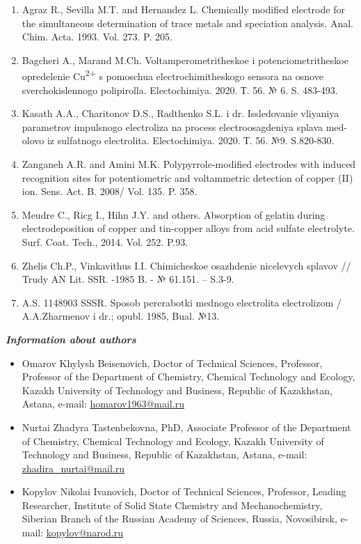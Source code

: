 \begin{enumerate}
\item
Agraz R., Sevilla M.T. and Hernandez L. Chemically modified
electrode for the simultaneous determination of trace metals and
speciation analysis. Anal. Chim. Acta. 1993. Vol. 273. P. 205.

\item
Bagcheri A., Marand M.Ch. Voltamperometritheskoe i
potenciometritheskoe opredelenie Cu\textsuperscript{2+} s pomoschua
electrochimitheskogo sensora na osnove sverchokislennogo polipirolla.
Electochimiya. 2020. Т. 56. № 6. S. 483-493.

\item
Kasath A.A., Charitonov D.S., Radthenko S.L. i dr. Issledovanie
vliyaniya parametrov impulsnogo electroliza na process electroosagdeniya
splava med-olovo iz sulfatnogo electrolita. Electochimiya. 2020. Т. 56.
№9. S.820-830.

\item
Zanganeh A.R. and Amini M.K. Polypyrrole-modified electrodes with
induced recognition sites for potentiometric and voltammetric detection
of copper (II) ion. Sens. Act. B. 2008/ Vol. 135. P. 358.

\item
Meudre C., Ricg I., Hihn J.Y. and others. Absorption of gelatin
during electrodeposition of copper and tin-copper alloys from acid
sulfate electrolyte. Surf. Coat. Tech., 2014. Vol. 252. P.93.

\item
Zhelis Ch.P., Vinkavithus I.I. Chimicheskoe osazhdenie nicelevych
splavov // Trudy AN Lit. SSR. -1985 B. - № 61.151. -- S.3-9.

\item
A.S. 1148903 SSSR. Sposob pererabotki mednogo electrolita
electrolizom / A.A.Zharmenov i dr.; opubl. 1985, Bual. №13.
\end{enumerate}

\begin{center}
\emph{{\bfseries Information about authors}}
\end{center}

\begin{itemize}
\item
Omarov Khylysh Beisenovich, Doctor of Technical Sciences, Professor,
Professor of the Department of Chemistry, Chemical Technology and
Ecology, Kazakh University of Technology and Business, Republic of
Kazakhstan, Astana, e-mail:
\href{mailto:homarov1963@mail.ru}{\ul{homarov1963@mail.ru}}

\item
Nurtai Zhadyra Tastenbekovna, PhD, Associate Professor of the Department
of Chemistry, Chemical Technology and Ecology, Kazakh University of
Technology and Business, Republic of Kazakhstan, Astana, e-mail:
\href{mailto:zhadira_nurtai@mail.ru}{\ul{zhadira\_nurtai@mail.ru}}

\item
Kopylov Nikolai Ivanovich, Doctor of Technical Sciences, Professor,
Leading Researcher, Institute of Solid State Chemistry and
Mechanochemistry, Siberian Branch of the Russian Academy of Sciences,
Russia, Novosibirsk, e-mail:
\href{mailto:kopylov@narod.ru}{\ul{kopylov@narod.ru}}
\end{itemize}

